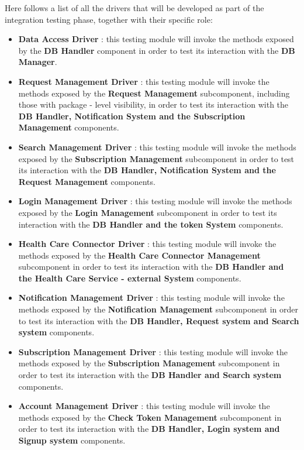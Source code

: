 \documentclass[a4paper, hidelinks, 12pt]{report}
\begin{document}
	Here follows a list of all the drivers that will be developed as part of the integration testing phase, together with their specific role:
	\begin{itemize}
\item{\textbf{Data Access Driver}} : this testing module will invoke the methods exposed by the \textbf{DB Handler} component in order to test its interaction with the \textbf{DB Manager}.
\item{\textbf{Request Management Driver}} : this testing module will invoke the methods exposed by the \textbf{Request Management} subcomponent, including those with package - level visibility, in order to test its interaction with the \textbf{DB Handler, Notification System and the Subscription Management} components.
\item{\textbf{Search Management Driver}} : this testing module will invoke the methods exposed by the \textbf{Subscription Management} subcomponent in order to test its interaction with the \textbf{DB Handler, Notification System and the Request Management} components.
\item{\textbf{Login Management Driver}} : this testing module will invoke the methods exposed by the \textbf{Login Management} subcomponent in order to test its interaction with the \textbf{DB Handler and the token System} components.
\item{\textbf{Health Care Connector Driver}} : this testing module will invoke the methods exposed by the \textbf{Health Care Connector Management} subcomponent in order to test its interaction with the \textbf{DB Handler and the Health Care Service - external System} components.
\item{\textbf{Notification Management Driver}} : this testing module will invoke the methods exposed by the \textbf{Notification Management} subcomponent in order to test its interaction with the \textbf{DB Handler, Request system and Search system} components.
\item{\textbf{Subscription Management Driver}} : this testing module will invoke the methods exposed by the \textbf{Subscription Management} subcomponent in order to test its interaction with the \textbf{DB Handler and Search system} components.
\item{\textbf{Account Management Driver}} : this testing module will invoke the methods exposed by the \textbf{Check Token Management} subcomponent in order to test its interaction with the \textbf{DB Handler, Login system and Signup system} components.
\end{itemize}
	
\end{document}
